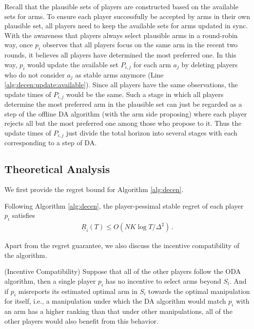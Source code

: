 Recall that the plausible sets of players are constructed based on the available sets for arms. 
To ensure each player successfully be accepted by arms in their own plausible set, all players need to keep the available sets for arms updated in sync. 
With the awareness that players always select plausible arms in a round-robin way, once $p_i$ observes that all players focus on the same arm in the recent two rounds, it believes all players have determined the most preferred one. 
In this way, $p_i$ would update the available set $P_{i,j}$ for each arm $a_j$ by deleting players who do not consider $a_j$ as stable arms anymore (Line \ref{alg:decen:update:available}).
Since all players have the same observations, the update times of $P_{i,j}$ would be the same. 
Such a stage in which all players determine the most preferred arm in the plausible set can just be regarded as a step of the offline DA algorithm (with the arm side proposing) where each player rejects all but the most preferred one among those who propose to it. 
Thus the update times of $P_{i,j}$ just divide the total horizon into several stages with each corresponding to a step of DA. 



\subsection{Theoretical Analysis}\label{sec:main:analysis}

We first provide the regret bound for Algorithm \ref{alg:decen}. 


\begin{theorem}\label{thm:decen}
   Following Algorithm \ref{alg:decen}, the player-pessimal stable regret of each player $p_i$ satisfies
    \begin{align}
        \underline{R}_i(T) \le 
        O(NK\log T/\Delta^2) \,.
    \end{align}
\end{theorem}



Apart from the regret guarantee, we also discuss the incentive compatibility of the algorithm. 


\begin{theorem}\label{thm:decen:strategy}{(Incentive Compatibility)}
Suppose that all of the other players follow the ODA algorithm, then a single player $p_i$ has no incentive to select arms beyond $S_i$.  
And if $p_i$ misreports its estimated optimal arm in $S_i$ towards the optimal manipulation for itself, i.e., a manipulation under which the DA algorithm would match $p_i$ with an arm has a higher ranking than that under other manipulations, all of the other players would also benefit from this behavior. 
\end{theorem}


